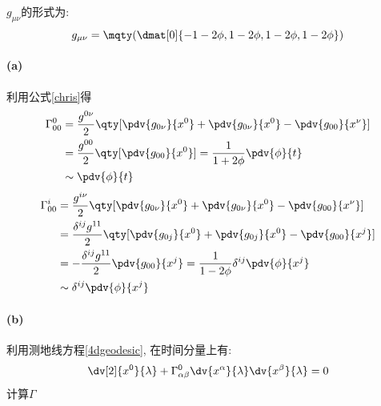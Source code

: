 $g_{\mu\nu}$的形式为:
$$g_{\mu\nu} = \mqty(\dmat[0]{-1 - 2 \phi,1 - 2\phi,1- 2\phi,1- 2\phi})$$
\paragraph{(a)}
利用公式\ref{chris}得
\begin{align*}
    \Gamma^0_{00} &= \frac{g^{0\nu}}{2}\qty[\pdv{g_{0\nu}}{x^0}+\pdv{g_{0\nu}}{x^0}-\pdv{g_{00}}{x^\nu}]\\
        &=\frac{g^{00}}{2}\qty[\pdv{g_{00}}{x^0}] = \frac{1}{1 + 2\phi} \pdv{\phi}{t}\\
        &\sim\pdv{\phi}{t}
\end{align*}
\begin{align*}
    \Gamma^i_{00} &= \frac{g^{i\nu}}{2}\qty[\pdv{g_{0\nu}}{x^0}+\pdv{g_{0\nu}}{x^0}-\pdv{g_{00}}{x^\nu}]\\
    & = \frac{\delta^{ij} g^{11}}{2}\qty[\pdv{g_{0j}}{x^0}+\pdv{g_{0j}}{x^0}-\pdv{g_{00}}{x^j}] \\
    & = -\frac{\delta^{ij} g^{11}}{2}\pdv{g_{00}}{x^j} = \frac{1}{1-2\phi} \delta^{ij}\pdv{\phi}{x^j}\\
    & \sim \delta^{ij} \pdv{\phi}{x^j}
\end{align*}


\paragraph{(b)}
利用测地线方程\ref{4dgeodesic}, 在时间分量上有:
\begin{align*}
    \dv[2]{x^0}{\lambda} + \Gamma^0_{\alpha\beta}\dv{x^\alpha}{\lambda}\dv{x^\beta}{\lambda} = 0
\end{align*}
计算$\Gamma$